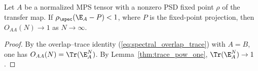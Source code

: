 \begin{theorem}%
    \label{thm:primitive_overlap}
    \leanok
    Let $A$ be a normalized MPS tensor with a nonzero PSD fixed point
    $\rho$ of the transfer map. If $\rho_{\spec}(\E_A-P)<1$, where $P$ is
    the fixed-point projection, then $O_{AA}(N)\to1$ as $N\to\infty$.
\end{theorem}

\begin{proof}
    \leanok
    By the overlap--trace identity (\ref{eq:spectral_overlap_trace}) with
    $A=B$, one has $O_{AA}(N)=\Tr(\E_A^N)$.
    By Lemma~\ref{thm:trace_pow_one}, $\Tr(\E_A^N)\to1$.
\end{proof}
